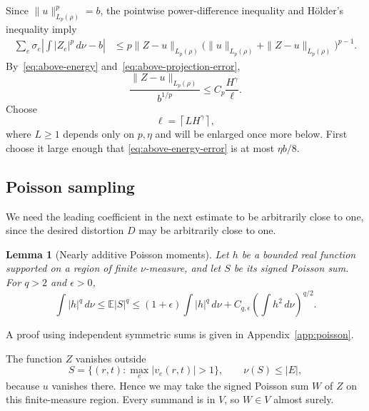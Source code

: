 \documentclass[11pt]{article}
\newcommand{\E}{\mathbb E}
\newtheorem{lemma}[theorem]{Lemma}
\theoremstyle{remark}
\numberwithin{equation}{section}
\begin{document}
Since $\|u\|_{L_p(\rho)}^p=b$, the pointwise power-difference
inequality and H\"older's inequality imply
\begin{align}
 \sum_e\sigma_e\left|\int|Z_e|^p\,d\nu-b\right|
 &\le p\|Z-u\|_{L_p(\rho)}
       \bigl(\|u\|_{L_p(\rho)}+
                    \|Z-u\|_{L_p(\rho)}\bigr)^{p-1}.
 \label{eq:above-energy-error}
\end{align}
By~\eqref{eq:above-energy} and~\eqref{eq:above-projection-error},
\begin{equation}
 \frac{\|Z-u\|_{L_p(\rho)}}{b^{1/p}}
       \le C_p\frac{H^\gamma}{\ell}.
 \label{eq:above-relative-error}
\end{equation}
Choose
\begin{equation}
 \ell=\left\lceil L H^\gamma\right\rceil,
 \label{eq:above-length}
\end{equation}
where $L\ge1$ depends only on $p,\eta$ and will be enlarged once
more below. First choose it large enough that
\eqref{eq:above-energy-error} is at most $\eta b/8$.

\subsection{Poisson sampling}

We need the leading coefficient in the next estimate to be arbitrarily
close to one, since the desired distortion $D$ may be arbitrarily
close to one.

\begin{lemma}[Nearly additive Poisson moments]\label{lem:poisson-moments}
Let $h$ be a bounded real function supported on a region of finite
$\nu$-measure, and let $S$ be its signed Poisson sum.
For $q>2$ and $\epsilon>0$,
\begin{equation}\label{eq:poisson-moments}
 \int|h|^q\,d\nu
 \le\E|S|^q
 \le(1+\epsilon)\int|h|^q\,d\nu
   +C_{q,\epsilon}\left(\int h^2\,d\nu\right)^{q/2}.
\end{equation}
\end{lemma}

A proof using independent symmetric sums is given in
Appendix~\ref{app:poisson}.

The function $Z$ vanishes outside
\[
 S=\{(r,t):\max_e|v_e(r,t)|>1\},
 \qquad \nu(S)\le |E|,
\]
because $u$ vanishes there. Hence we may take the signed Poisson sum
$W$ of $Z$ on this finite-measure region. Every summand is in $V$,
so $W\in V$ almost surely.
\end{document}
